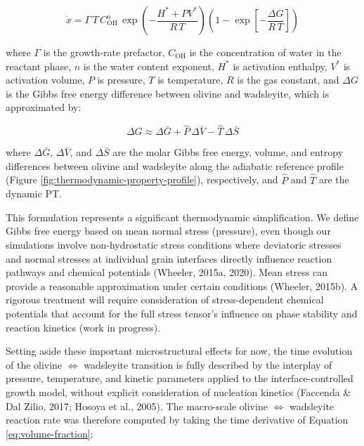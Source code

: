 \documentclass[draft,linenumbers]{agujournal2019}
\begin{document}
\begin{equation}
  \dot{x} = \Gamma\, T\, C_\mathrm{OH}^n\, \exp\!\left(-\frac{H^{\ast} + P V^{\ast}}{R\, T}\right) \left(1 - \exp\!\left[-\frac{\Delta G}{R\, T}\right] \right)
  \label{eq:growth-rate}
\end{equation}

where \(\Gamma\) is the growth-rate prefactor, \(C_\mathrm{OH}\) is the
concentration of water in the reactant phase, \(n\) is the water content
exponent, \(H^{\ast}\) is activation enthalpy, \(V^{\ast}\) is
activation volume, \(P\) is pressure, \(T\) is temperature, \(R\) is the
gas constant, and \(\Delta G\) is the Gibbs free energy difference
between olivine and wadsleyite, which is approximated by:

\begin{equation}
  \Delta G \approx \Delta \bar{G} + \hat{P}\, \Delta \bar{V} - \hat{T}\, \Delta \bar{S}
  \label{eq:gibbs}
\end{equation}

where \(\Delta \bar{G}\), \(\Delta \bar{V}\), and \(\Delta \bar{S}\) are
the molar Gibbs free energy, volume, and entropy differences between
olivine and wadsleyite along the adiabatic reference profile (Figure
\ref{fig:thermodynamic-property-profile}), respectively, and \(\hat{P}\)
and \(\hat{T}\) are the dynamic PT.

This formulation represents a significant thermodynamic simplification.
We define Gibbs free energy based on mean normal stress (pressure), even
though our simulations involve non-hydrostatic stress conditions where
deviatoric stresses and normal stresses at individual grain interfaces
directly influence reaction pathways and chemical potentials (Wheeler,
2015a, 2020). Mean stress can provide a reasonable approximation under
certain conditions (Wheeler, 2015b). A rigorous treatment will require
consideration of stress-dependent chemical potentials that account for
the full stress tensor's influence on phase stability and reaction
kinetics (work in progress).

Setting aside these important microstructural effects for now, the time
evolution of the olivine \(\Leftrightarrow\) wadsleyite transition is
fully described by the interplay of pressure, temperature, and kinetic
parameters applied to the interface-controlled growth model, without
explicit consideration of nucleation kinetics (Faccenda \& Dal Zilio,
2017; Hosoya et al., 2005). The macro-scale olivine \(\Leftrightarrow\)
wadsleyite reaction rate was therefore computed by taking the time
derivative of Equation \ref{eq:volume-fraction}:
\end{document}
